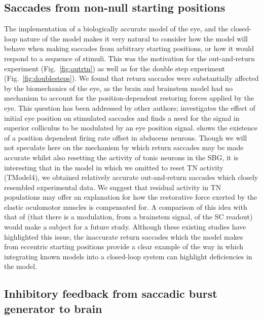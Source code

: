 \documentclass{frontiersSCNS}
\begin{document}
\subsection{Saccades from non-null starting positions}

The implementation of a biologically accurate model of the eye, and
the closed-loop nature of the model makes it very natural to consider
how the model will behave when making saccades from arbitrary starting
positions, or how it would respond to a sequence of stimuli. This was
the motivation for the out-and-return experiment (Fig.~\ref{fig:outrtn})
as well as for the double step experiment (Fig.~\ref{fig:doublesteps}).
We found that return saccades were substantially affected by the
biomechanics of the eye, as the brain and brainstem model had no
mechanism to account for the position-dependent restoring forces
applied by the eye. This question has been addressed by other authors;
\cite{groh_effects_2011} investigates the effect of
initial eye position on stimulated saccades and finds a need for the
signal in superior colliculus to be modulated by an eye position
signal. \cite{ling_effects_2007} shows the existence of a position
dependent firing rate offset in abducens neurons. Though we will not
speculate here on the mechanism by which return saccades may be made
accurate whilst also resetting the activity of tonic neurons in the
SBG, it is interesting that in the model in which we omitted to reset
TN activity (TModel4), we obtained relatively accurate out-and-return
saccades which closely resembled experimental data.  We suggest that
residual activity in TN populations may offer an explanation for how
the restorative force exerted by the elastic oculomotor muscles is
compensated for. A comparison of this idea with that
of \cite{groh_effects_2011} (that there is a modulation, from a
brainstem signal, of the SC readout) would make a subject for a future
study. Although these existing studies have highlighted this issue,
the inaccurate return saccades which the model makes from eccentric
starting positions provide a clear example of the way in which
integrating known models into a closed-loop system can highlight
deficiencies in the model.

\subsection{Inhibitory feedback from saccadic burst generator to brain}
\end{document}
